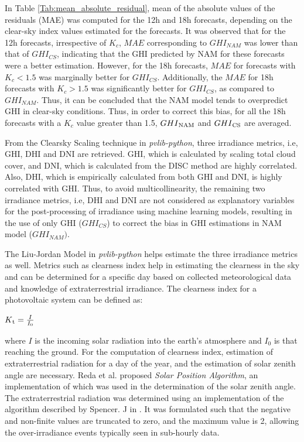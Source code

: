 \par In Table \ref{Tab:mean_absolute_residual}, mean of the absolute values of the residuals (MAE) was computed for the 12h and 18h forecasts, depending on the clear-sky index values estimated for the forecasts. It was observed that for the 12h forecasts, irrespective of $K_c$, $MAE$ corresponding to $GHI_{NAM}$ was lower than that of $GHI_{CS}$, indicating that the GHI predicted by NAM for these forecasts were a better estimation. However, for the 18h forecasts, $MAE$ for forecasts with $K_c < 1.5$ was marginally better for $GHI_{CS}$. Additionally, the $MAE$ for 18h forecasts with $K_c > 1.5$ was significantly better for $GHI_{CS}$, as compared to $GHI_{NAM}$. Thus, it can be concluded that the NAM model tends to overpredict GHI in clear-sky conditions. Thus, in order to correct this bias, for all the 18h forecasts with a $K_c$ value greater than 1.5, $GHI\textsubscript{NAM}$ and $GHI\textsubscript{CS}$ are averaged.

\par From the Clearsky Scaling technique in \textit{pvlib-python}, three irradiance metrics, i.e, GHI, DHI and DNI are retrieved. GHI, which is calculated by scaling total cloud cover, and DNI, which is calculated from the DISC method are highly correlated. Also, DHI, which is empirically calculated from both GHI and DNI, is highly correlated with GHI. Thus, to avoid multicollinearity, the remaining two irradiance metrics, i.e, DHI and DNI are not considered as explanatory variables for the post-processing of irradiance using machine learning models, resulting in the use of only GHI ($GHI_{CS}$) to correct the bias in GHI estimations in NAM model ($GHI_{NAM})$.

The Liu-Jordan Model in \textit{pvlib-python} helps estimate the three irradiance metrics as well. Metrics such as clearness index help in estimating the clearness in the sky and can be determined for a specific day based on collected meteorological data and knowledge of extraterrestrial irradiance. The clearness index for a photovoltaic system can be defined as:
\begin{center}
    $K\textsubscript{t} = \frac{I}{I_0}$
\end{center}
where $I$ is the incoming solar radiation into the earth's atmosphere and $I_0$ is that reaching the ground. For the computation of clearness index, estimation of extraterrestrial radiation for a day of the year, and the estimation of solar zenith angle are necessary. Reda et al. \cite{multimodel_spa} proposed \textit{Solar Position Algorithm}, an implementation of which was used in the determination of the solar zenith angle. The extraterrestrial radiation was determined using an implementation of the algorithm described by Spencer. J in \cite{multimodel_extraterrestrial}. It was formulated such that the negative and non-finite values are truncated to zero, and the maximum value is 2, allowing the over-irradiance events typically seen in sub-hourly data.

